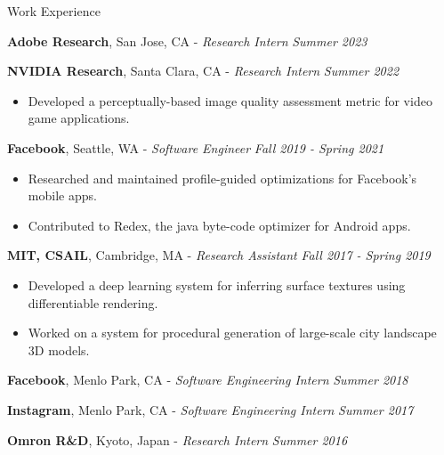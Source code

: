 \documentclass{resume}
\begin{document}
\begin{area}{Work Experience}
    \item
        \textbf{Adobe Research}, San Jose, CA -
        \emph{Research Intern} \hfill \emph{Summer 2023}
    \item
        \textbf{NVIDIA Research}, Santa Clara, CA - \emph{Research Intern} \hfill \emph{Summer 2022}
        \begin{itemize}
            \item Developed a perceptually-based image quality assessment metric for video game applications.
        \end{itemize}
    \item
        \textbf{Facebook}, Seattle, WA - \emph{Software Engineer} \hfill \emph{Fall 2019 - Spring 2021}
        \begin{itemize}
            \item Researched and maintained profile-guided optimizations for Facebook's mobile apps.
            \item Contributed to Redex, the java byte-code optimizer for Android apps.
        \end{itemize}
    \item
        \textbf{MIT, CSAIL}, Cambridge, MA - \emph{Research Assistant} \hfill \emph{Fall 2017 - Spring 2019}
        \begin{itemize}
            \item Developed a deep learning system for inferring surface textures using differentiable rendering.
            \item Worked on a system for procedural generation of large-scale city landscape 3D models.
        \end{itemize}
    \item
        \textbf{Facebook}, Menlo Park, CA - \emph{Software Engineering Intern} \hfill \emph{Summer 2018}
    \item
        \textbf{Instagram}, Menlo Park, CA - \emph{Software Engineering Intern} \hfill \emph{Summer 2017}
    \item
        \textbf{Omron R\&D}, Kyoto, Japan - \emph{Research Intern} \hfill \emph{Summer 2016}

\end{area}
\end{document}
